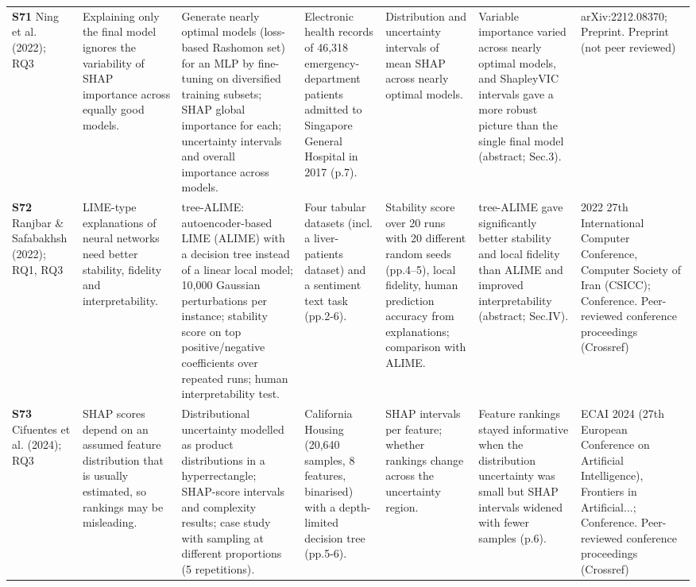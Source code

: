 \begin{longtable}{@{}P{1.55cm}P{2.9cm}P{4.5cm}P{3.2cm}P{3.4cm}P{4.6cm}P{3.6cm}@{}}
\textbf{S71} \cite{S71} Ning et al. (2022); RQ3 & Explaining only the final model ignores the variability of SHAP importance across equally good models. & Generate nearly optimal models (loss-based Rashomon set) for an MLP by fine-tuning on diversified training subsets; SHAP global importance for each; uncertainty intervals and overall importance across models. & Electronic health records of 46,318 emergency-department patients admitted to Singapore General Hospital in 2017 (p.7). & Distribution and uncertainty intervals of mean \textbar{}SHAP\textbar{} across nearly optimal models. & Variable importance varied across nearly optimal models, and ShapleyVIC intervals gave a more robust picture than the single final model (abstract; Sec.3). & arXiv:2212.08370; Preprint. Preprint (not peer reviewed) \\
\textbf{S72} \cite{S72} Ranjbar \& Safabakhsh (2022); RQ1, RQ3 & LIME-type explanations of neural networks need better stability, fidelity and interpretability. & tree-ALIME: autoencoder-based LIME (ALIME) with a decision tree instead of a linear local model; 10,000 Gaussian perturbations per instance; stability score on top positive/\allowbreak{}negative coefficients over repeated runs; human interpretability test. & Four tabular datasets (incl. a liver-patients dataset) and a sentiment text task (pp.2-6). & Stability score over 20 runs with 20 different random seeds (pp.4--5), local fidelity, human prediction accuracy from explanations; comparison with ALIME. & tree-ALIME gave significantly better stability and local fidelity than ALIME and improved interpretability (abstract; Sec.IV). & 2022 27th International Computer Conference, Computer Society of Iran (CSICC); Conference. Peer-reviewed conference proceedings (Crossref) \\
\textbf{S73} \cite{S73} Cifuentes et al. (2024); RQ3 & SHAP scores depend on an assumed feature distribution that is usually estimated, so rankings may be misleading. & Distributional uncertainty modelled as product distributions in a hyperrectangle; SHAP-score intervals and complexity results; case study with sampling at different proportions (5 repetitions). & California Housing (20,640 samples, 8 features, binarised) with a depth-limited decision tree (pp.5-6). & SHAP intervals per feature; whether rankings change across the uncertainty region. & Feature rankings stayed informative when the distribution uncertainty was small but SHAP intervals widened with fewer samples (p.6). & ECAI 2024 (27th European Conference on Artificial Intelligence), Frontiers in Artificial...; Conference. Peer-reviewed conference proceedings (Crossref) \\

\end{longtable}
